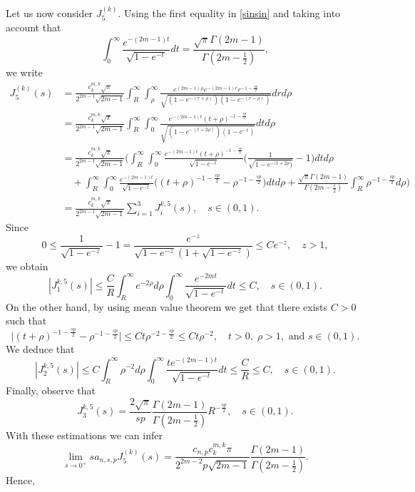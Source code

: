 \documentclass[a4paper,10pt, reqno]{amsart}
\theoremstyle{definition}
\theoremstyle{remark}
\numberwithin{equation}{section}
\begin{document}
{Let us now consider $J_5^{(k)}$. Using the first equality in \eqref{sinsin} and taking into account that 
$$
\int_0^\infty \frac{e^{-(2m-1)t}}{\sqrt{1-e^{-t}}}dt=\frac{\sqrt{\pi}\Gamma (2m-1)}{\Gamma (2m-\frac{1}{2})},
$$
we write
\begin{align}\label{Jik5}
    J_5^{(k)}(s)&=\frac{c_k^{m,k}\sqrt{\pi}}{2^{2m-1}\sqrt{2m-1}}\int_R^\infty\int_\rho ^\infty\frac{e^{(2m-1)\rho }e^{-(2m-1)r}r^{-1-\frac{sp}{2}}}{\sqrt{(1-e^{-(r+\rho)})(1-e^{-(r-\rho )})}}drd\rho\nonumber\\
    &=\frac{c_k^{m,k}\sqrt{\pi}}{2^{2m-1}\sqrt{2m-1}}\int_R^\infty\int_0^\infty\frac{e^{-(2m-1)t}(t+\rho)^{-1-\frac{sp}{2}}}{\sqrt{(1-e^{-(t+2\rho)})(1-e^{-t})}}dtd\rho\nonumber\\
    &=\frac{c_k^{m,k}\sqrt{\pi}}{2^{2m-1}\sqrt{2m-1}}\Big(\int_R^\infty\int_0^\infty\frac{e^{-(2m-1)t}(t+\rho)^{-1-\frac{sp}{2}}}{\sqrt{1-e^{-t}}}\Big(\frac{1}{\sqrt{1-e^{-(t+2\rho})}}-1\Big)dtd\rho\nonumber\\
    &\quad +\int_R^\infty\int_0^\infty\frac{e^{-(2m-1)t}}{\sqrt{1-e^{-t}}}\Big((t+\rho)^{-1-\frac{sp}{2}}-\rho ^{-1-\frac{sp}{2}}\Big)dtd\rho+\frac{\sqrt{\pi}\Gamma (2m-1)}{\Gamma (2m-\frac{1}{2})}\int_R^\infty\rho ^{-1-\frac{sp}{2}}d\rho \Big)\nonumber\\
    &=\frac{c_k^{m,k}\sqrt{\pi}}{2^{2m-1}\sqrt{2m-1}}\sum_{i=1}^3 J_i^{k,5}(s),\quad s\in (0,1).
\end{align}
Since
$$
0\leq \frac{1}{\sqrt{1-e^{-z}}}-1=\frac{e^{-z}}{\sqrt{1-e^{-z}}(1+\sqrt{1-e^{-z}})}\leq Ce^{-z},\quad z>1,
$$
we obtain
$$
|J_1^{k,5}(s)|\leq \frac{C}{R}\int_R^\infty e^{-2\rho }d\rho \int_0^\infty \frac{e^{-2mt}}{\sqrt{1-e^{-t}}}dt\leq C,\quad s\in (0,1).
$$
On the other hand, by using mean value theorem we get that there exists $C>0$ such that
$$
\big|(t+\rho )^{-1-\frac{sp}{2}}-\rho ^{-1-\frac{sp}{2}}\big|\leq Ct\rho ^{-2-\frac{sp}{2}}\leq Ct\rho ^{-2},\quad t>0,\;\rho >1,\mbox{ and }s\in (0,1).
$$
We deduce that
$$
|J_2^{k,5}(s)|\leq C\int_R^\infty \rho ^{-2}d\rho \int_0^\infty \frac{te^{-(2m-1)t}}{\sqrt{1-e^{-t}}}dt\leq \frac{C}{R}\leq C,\quad s\in (0,1).
$$
Finally, observe that
\begin{equation}\label{J3k5}
J_3^{k,5}(s)=\frac{2\sqrt{\pi}}{sp}\frac{\Gamma(2m-1)}{\Gamma (2m-\frac{1}{2})}R^{-\frac{sp}{2}},\quad s\in (0,1).
\end{equation}
With these estimations we can infer
$$
\lim_{s\rightarrow 0^+}sa_{n,s,p}J_5^{(k)}(s)=\frac{c_{n,p}c_k^{m,k}\pi }{2^{2m-2}p\sqrt{2m-1}}\frac{\Gamma (2m-1)}{\Gamma (2m-\frac{1}{2})}.
$$
Hence,
\begin{align}\label{sT2}

\end{align}}
\end{document}
